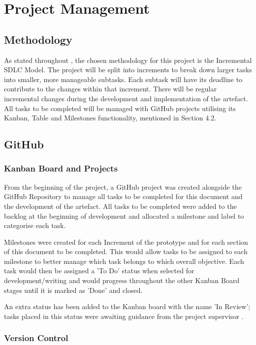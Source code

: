 \chapter{Project Management}

\section{Methodology}

As stated throughout , the chosen methodology for this project is the Incremental SDLC Model. The project will be split into increments to break down larger tasks into smaller, more manageable subtasks. Each subtask will have its deadline to contribute to the changes within that increment. There will be regular incremental changes during the development and implementation of the artefact. All tasks to be completed will be managed with GitHub projects utilising its Kanban, Table and Milestones functionality, mentioned in Section 4.2.

\section{GitHub}

\subsection{Kanban Board and Projects}
\label{pm:kanban}

From the beginning of the project, a GitHub project was created alongside the GitHub Repository to manage all tasks to be completed for this document and the development of the artefact. All tasks to be completed were added to the backlog at the beginning of development and allocated a milestone and label to categorise each task.

Milestones were created for each Increment of the prototype and for each section of this document to be completed. This would allow tasks to be assigned to each milestone to better manage which task belongs to which overall objective. Each task would then be assigned a 'To Do' status when selected for development/writing and would progress throughout the other Kanban Board stages until it is marked as 'Done' and closed.

An extra status has been added to the Kanban board with the name 'In Review'; tasks placed in this status were awaiting guidance from the project supervisor .

\subsection{Version Control}
\label{pm:version_control}

